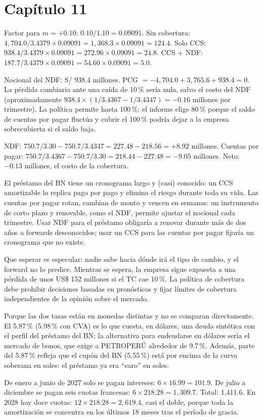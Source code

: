 \section*{Capítulo 11}

 Factor para $m=+0.10$: $0.10/1.10=0.09091$. Sin cobertura: $4{,}704.0/3.4379\times0.09091=1{,}368.3\times0.09091=124.4$. Solo CCS: $938.4/3.4379\times0.09091=272.96\times0.09091=24.8$. CCS + NDF: $187.7/3.4379\times0.09091=54.60\times0.09091=5.0$.

 Nocional del NDF: S/ 938.4 millones. PCG $=-4{,}704.0+3{,}765.6+938.4=0$. La pérdida cambiaria ante una caída de 10\,\% sería nula, salvo el costo del NDF (aproximadamente $938.4\times(1/3.4367-1/3.4347)=-0.16$ millones por trimestre). La política permite hasta 100\,\%; el informe elige 80\,\% porque el saldo de cuentas por pagar fluctúa y cubrir el 100\,\% podría dejar a la empresa sobrecubierta si el saldo baja.

 NDF: $750.7/3.30-750.7/3.4347=227.48-218.56=+8.92$ millones. Cuentas por pagar: $750.7/3.4367-750.7/3.30=218.44-227.48=-9.05$ millones. Neto: $-0.13$ millones, el costo de la cobertura.

 El préstamo del BN tiene un cronograma largo y (casi) conocido: un CCS amortizable lo replica pago por pago y elimina el riesgo durante toda su vida. Las cuentas por pagar rotan, cambian de monto y vencen en semanas: un instrumento de corto plazo y renovable, como el NDF, permite ajustar el nocional cada trimestre. Usar NDF para el préstamo obligaría a renovar durante más de dos años a forwards desconocidos; usar un CCS para las cuentas por pagar fijaría un cronograma que no existe.

 Que esperar es especular: nadie sabe hacia dónde irá el tipo de cambio, y el forward no lo predice. Mientras se espera, la empresa sigue expuesta a una pérdida de unos US\$ 152 millones si el TC cae 10\,\%. La política de cobertura debe prohibir decisiones basadas en pronósticos y fijar límites de cobertura independientes de la opinión sobre el mercado.

 Porque las dos tasas están en monedas distintas y no se comparan directamente. El 5.87\,\% (5.98\,\% con CVA) es lo que cuesta, en dólares, una deuda sintética con el perfil del préstamo del BN; la alternativa para endeudarse en dólares sería el mercado de bonos, que exige a PETROPERÚ alrededor de 9.7\,\%. Además, parte del 5.87\,\% refleja que el cupón del BN (5.55\,\%) está por encima de la curva soberana en soles: el préstamo ya era \enquote{caro} en soles.

 De enero a junio de 2027 solo se pagan intereses: $6\times16.99=101.9$. De julio a diciembre se pagan seis cuotas francesas: $6\times218.28=1{,}309.7$. Total: 1,411.6. En 2028 hay doce cuotas: $12\times218.28=2{,}619.4$, casi el doble, porque toda la amortización se concentra en los últimos 18 meses tras el período de gracia.
